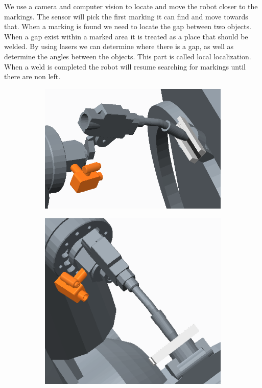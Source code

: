 We use a camera and computer vision to locate and move the robot closer to the markings.
The sensor will pick the first marking it can find and move towards that. 
When a marking is found we need to locate the gap between two objects. 
When a gap exist within a marked area it is treated as a place that should be welded.
By using lasers we can determine where there is a gap, as well as determine the angles between the objects.
This part is called local localization.
When a weld is completed the robot will resume searching for markings until there are non left.
\begin{figure}
\begin{subfigure}[b]{0.5\textwidth}
\includegraphics[width=\textwidth]{graphics/CAD1}
\caption{}
\label{}
\end{subfigure}
\begin{subfigure}[b]{0.5\textwidth}
\includegraphics[width=\textwidth]{graphics/CAD2}

\end{subfigure}
\end{figure}
